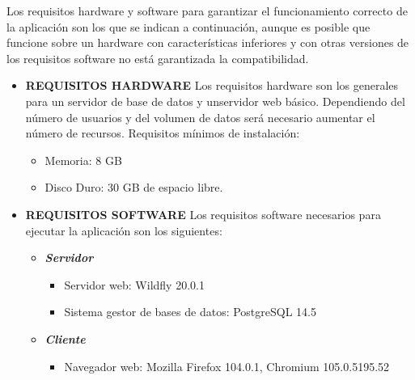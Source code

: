 Los requisitos hardware y software para garantizar el funcionamiento correcto de
la aplicación son los que se indican a continuación, aunque es posible que funcione
sobre un hardware con características inferiores y con otras versiones de los requisitos
software no está garantizada la compatibilidad.
\begin{itemize}
\item \textbf{REQUISITOS HARDWARE}\newline
Los requisitos hardware son los generales para un servidor de base de datos y unservidor web básico. Dependiendo del número de usuarios y del volumen de datos será necesario aumentar el número de recursos.
Requisitos mínimos de instalación:
	\begin{itemize}
	\item Memoria: 8 GB
	\item Disco Duro: 30 GB de espacio libre.
	\end{itemize} 

\item \textbf{REQUISITOS SOFTWARE}\newline
Los requisitos software necesarios para ejecutar la aplicación son los siguientes:
	\begin{itemize}
		\item \textit{\textbf{Servidor}}
		\begin{itemize}
			\item Servidor web: Wildfly 20.0.1
			\item Sistema gestor de bases de datos: PostgreSQL 14.5
		\end{itemize}

		\item \textit{\textbf{Cliente}}
		\begin{itemize}
			\item Navegador web: Mozilla Firefox 104.0.1, Chromium 105.0.5195.52
		\end{itemize}
	\end{itemize}
\end{itemize}




